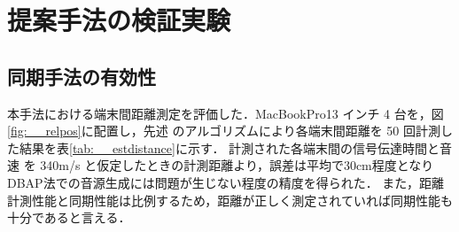\chapter{提案手法の検証実験}

\section{同期手法の有効性}

本手法における端末間距離測定を評価した．MacBookPro13 インチ 4 台を，図\ref{fig:__relpos}に配置し，先述 のアルゴリズムにより各端末間距離を 50 回計測した結果を表\ref{tab:__estdistance}に示す．
計測された各端末間の信号伝達時間と音速 を 340m/s と仮定したときの計測距離より，誤差は平均で30cm程度となりDBAP法での音源生成には問題が生じない程度の精度を得られた．
また，距離計測性能と同期性能は比例するため，距離が正しく測定されていれば同期性能も十分であると言える．

